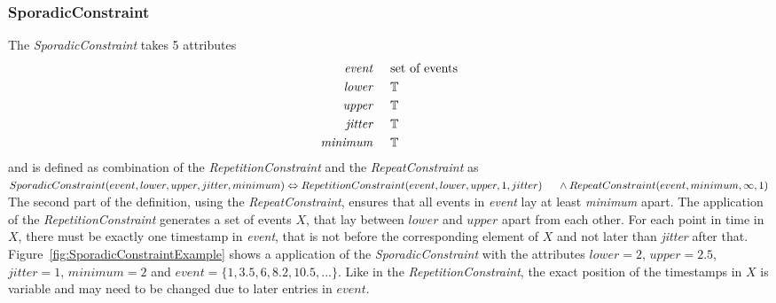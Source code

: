 	\subsubsection{SporadicConstraint}
		The \emph{SporadicConstraint} takes 5 attributes
		\begin{align*}
			\emph{event} 	& \hspace{.5cm}\text{set of events}\\
			\emph{lower} 	& \hspace{.5cm}\mathbb{T}\\
			\emph{upper} 	& \hspace{.5cm}\mathbb{T}\\
			\emph{jitter}	& \hspace{.5cm}\mathbb{T}\\
			\emph{minimum}	& \hspace{.5cm}\mathbb{T}
		\end{align*}
		and is defined as combination of the \emph{RepetitionConstraint} and the \emph{RepeatConstraint} as\\[10pt]
		\begin{math}
			SporadicConstraint ( event, lower, upper, jitter, minimum )\\
			\Leftrightarrow RepetitionConstraint(event, lower, upper, 1, jitter)\\
			\hspace*{.5cm}\land RepeatConstraint(event, minimum, \infty, 1)
		\end{math}\\[10pt]
		The second part of the definition, using the \emph{RepeatConstraint}, ensures that all events in \emph{event} lay at least \emph{minimum} apart. The application of the \emph{RepetitionConstraint} generates a set of events $X$, that lay between $lower$ and $upper$ apart from each other. For each point in time in $X$, there must be exactly one timestamp in \emph{event}, that is not before the corresponding element of $X$ and not later than \emph{jitter} after that.\\
		Figure~\ref{fig:SporadicConstraintExample} shows a application of the \emph{SporadicConstraint} with the attributes $lower=2$, $upper=2.5$, $jitter=1$, $minimum=2$ and $event=\{1, 3.5, 6, 8.2, 10.5,...\}$. Like in the \emph{RepetitionConstraint}, the exact position of the timestamps in $X$ is variable and may need to be changed due to later entries in $event$.
